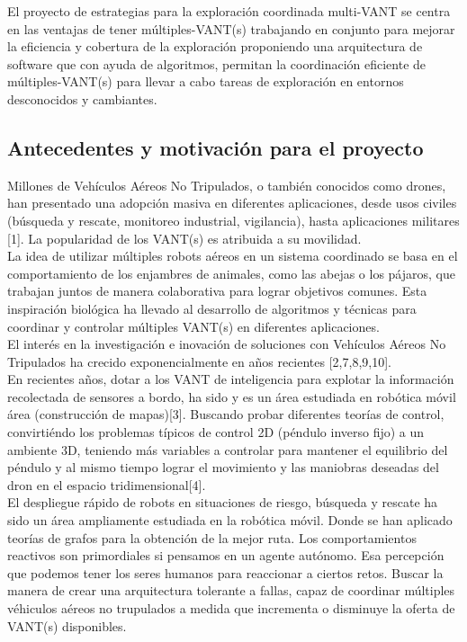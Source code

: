 \documentclass[11pt,epsf,times]{article}
\begin{document}
El proyecto de estrategias para la exploración coordinada multi-VANT se centra en las ventajas de tener múltiples-VANT(s) trabajando en conjunto para mejorar la eficiencia y cobertura de la exploración proponiendo una arquitectura de software que con ayuda de algoritmos, permitan la coordinación eficiente de múltiples-VANT(s) para llevar a cabo tareas de exploración en entornos desconocidos y cambiantes.

\subsection{Antecedentes y motivaci\'{o}n para el proyecto}

Millones de Vehículos Aéreos No Tripulados, o también conocidos como drones, han presentado una adopción masiva en diferentes aplicaciones, desde usos civiles (búsqueda y rescate, monitoreo industrial, vigilancia), hasta aplicaciones militares [1]. La popularidad de los VANT(s) es atribuida a su movilidad.\\

La idea de utilizar múltiples robots aéreos en un sistema coordinado se basa en el comportamiento de los enjambres de animales, como las abejas o los pájaros, que trabajan juntos de manera colaborativa para lograr objetivos comunes. Esta inspiración biológica ha llevado al desarrollo de algoritmos y técnicas para coordinar y controlar múltiples VANT(s) en diferentes aplicaciones.\\

El interés en la investigación e inovación de soluciones con Vehículos Aéreos No Tripulados ha crecido exponencialmente en años recientes [2,7,8,9,10].\\

En recientes años, dotar a los VANT de inteligencia para explotar la información recolectada de sensores a bordo, ha sido y es un área estudiada en robótica móvil área (construcción de mapas)[3]. Buscando probar diferentes teorías de control, convirtiéndo los problemas típicos de control 2D (péndulo inverso fijo) a un ambiente 3D, teniendo más variables a controlar para mantener el equilibrio del péndulo y al mismo tiempo lograr el movimiento y las maniobras deseadas del dron en el espacio tridimensional[4].\\

El despliegue rápido de robots en situaciones de riesgo, búsqueda y rescate ha sido un área ampliamente estudiada en la robótica móvil. Donde se han aplicado teorías de grafos para la obtención de la mejor ruta. Los comportamientos reactivos son primordiales si pensamos en un agente autónomo. Esa percepción que podemos tener los seres humanos para reaccionar a ciertos retos. Buscar la manera de crear una arquitectura tolerante a fallas, capaz de coordinar múltiples véhiculos aéreos no trupulados a medida que incrementa o disminuye la oferta de VANT(s) disponibles.\\
\end{document}

